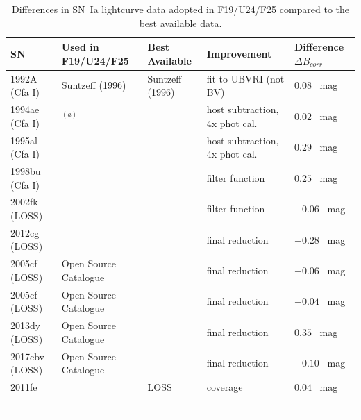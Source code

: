 \begin{table}[h!]
\centering
\caption{Differences in SN~Ia lightcurve data adopted in F19/U24/F25 compared to the best available data.}
\begin{tabular}{lllll}
\hline
\hline
SN & Used in F19/U24/F25 & Best Available & Improvement & Difference $\Delta B_{corr}$\\
\hline
1992A  (Cfa I)      & Suntzeff (1996)   & Suntzeff (1996)    &  fit to UBVRI (not BV) &  $0.08$ \, mag \\
1994ae (Cfa I)      & \citet{1999AJ....117..707R}$^{(a)}$ & \citet{2005ApJ...627..579R}   &  host subtraction, 4x phot cal. &  $0.02$ \, mag \\
1995al (Cfa I)     & \citet{1999AJ....117..707R} & \citet{2009ApJS..183..109R}   &  host subtraction, 4x phot cal. &  $0.29$ \, mag \\
1998bu (Cfa I)      & \citet{1999ApJS..125...73J} & \citet{1999ApJS..125...73J}   &  filter function &  $0.25$ \, mag \\
2002fk (LOSS)      & \citet{2009ApJS..183..109R}  & \citet{2009ApJS..183..109R}    &  filter function &  $-0.06$ \, mag \\
2012cg (LOSS) & \citet{2016ApJ...820...92M}  & \citet{2019MNRAS.490.3882S}    & final reduction  & $-0.28$ \, mag \\ 
2005cf (LOSS) & Open Source Catalogue &  \citet{2019MNRAS.490.3882S} & final reduction & $-0.06$ \, mag \\ 
2005cf (LOSS) &  Open Source Catalogue & \citet{2019MNRAS.490.3882S} & final reduction & $-0.04$ \, mag \\ 
2013dy (LOSS) &  Open Source Catalogue  & \citet{2019MNRAS.490.3882S}  &  final reduction  & $0.35$ \, mag \\ 
2017cbv (LOSS) & Open Source Catalogue & \citet{2019MNRAS.490.3882S} &  final reduction & $-0.10$ \, mag \\
2011fe  & \citet{2012JAVSO..40..872R} & LOSS &  coverage &  $0.04$ \, mag  \\
\hline
~ \\
\end{tabular}
\label{table:choice_data}
\end{table}

